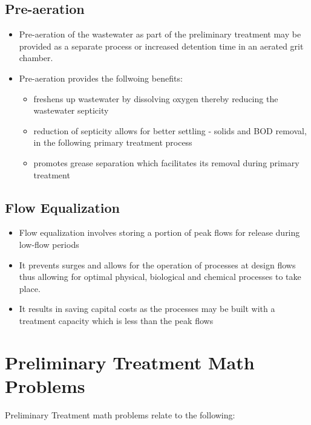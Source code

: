 \subsection{Pre-aeration}	
	\begin{itemize}
		\item Pre-aeration of the wastewater as part of the preliminary treatment may be provided as a separate process or increased detention time in an aerated grit chamber.
		\item Pre-aeration provides the follwoing benefits:
			\begin{itemize}
				\item freshens up wastewater by dissolving oxygen thereby reducing the wastewater septicity
				\item reduction of septicity allows for better settling - solids and BOD removal, in the following primary treatment process
				\item promotes grease separation which facilitates its removal during primary treatment
			\end{itemize}
	\end{itemize}
\subsection{Flow Equalization}	

	\begin{itemize}
		\item Flow equalization involves storing a portion of peak flows for release during low-flow periods
		\item It prevents surges and allows for the operation of processes at design flows thus allowing for optimal physical, biological and chemical processes to take place.
		\item It results in saving capital costs as the processes may be built with a treatment capacity which is less than the peak flows
	\end{itemize}

\section{Preliminary Treatment Math Problems}

Preliminary Treatment math problems relate to the following:

